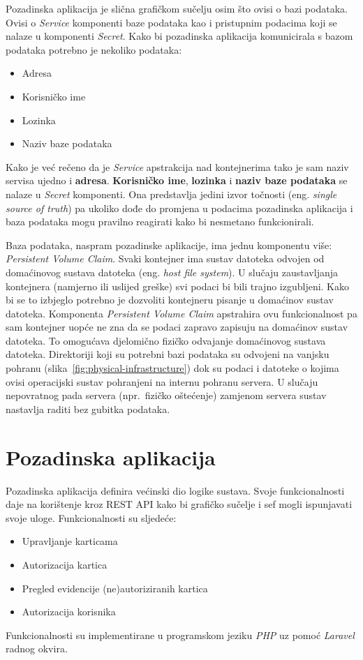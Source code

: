 Pozadinska aplikacija je slična grafičkom sučelju osim što ovisi o bazi podataka.
Ovisi o \textit{Service} komponenti baze podataka kao i pristupnim podacima koji se nalaze u komponenti \textit{Secret}.
Kako bi pozadinska aplikacija komunicirala s bazom podataka potrebno je nekoliko podataka:
\begin{itemize}
    \item Adresa
    \item Korisničko ime
    \item Lozinka
    \item Naziv baze podataka
\end{itemize}

Kako je već rečeno da je \textit{Service} apstrakcija nad kontejnerima tako je sam naziv servisa ujedno i \textbf{adresa}.
\textbf{Korisničko ime}, \textbf{lozinka} i \textbf{naziv baze podataka} se nalaze u \textit{Secret} komponenti.
Ona predstavlja jedini izvor točnosti (eng. \textit{single source of truth}) pa ukoliko dođe do promjena
u podacima pozadinska aplikacija i baza podataka mogu pravilno reagirati kako bi nesmetano funkcionirali.

Baza podataka, naspram pozadinske aplikacije, ima jednu komponentu više: \textit{Persistent Volume Claim}.
Svaki kontejner ima sustav datoteka odvojen od domaćinovog sustava datoteka (eng. \textit{host file system}).
U slučaju zaustavljanja kontejnera (namjerno ili uslijed greške) svi podaci bi bili trajno izgubljeni.
Kako bi se to izbjeglo potrebno je dozvoliti kontejneru pisanje u domaćinov sustav datoteka.
Komponenta \textit{Persistent Volume Claim} apstrahira ovu funkcionalnost pa sam kontejner uopće ne zna da se podaci zapravo
zapisuju na domaćinov sustav datoteka.
To omogućava djelomično fizičko odvajanje domaćinovog sustava datoteka.
Direktoriji koji su potrebni bazi podataka su odvojeni na vanjsku pohranu (slika~\ref{fig:physical-infrastructure}) dok su
podaci i datoteke o kojima ovisi operacijski sustav pohranjeni na internu pohranu servera.
U slučaju nepovratnog pada servera (npr.~fizičko oštećenje) zamjenom servera sustav nastavlja raditi bez gubitka podataka.

\section{Pozadinska aplikacija}

Pozadinska aplikacija definira većinski dio logike sustava.
Svoje funkcionalnosti daje na korištenje kroz REST API kako bi grafičko sučelje i sef mogli ispunjavati svoje uloge.
Funkcionalnosti su sljedeće:

\begin{itemize}
    \item Upravljanje karticama
    \item Autorizacija kartica
    \item Pregled evidencije (ne)autoriziranih kartica
    \item Autorizacija korisnika
\end{itemize}

Funkcionalnosti su implementirane u programskom jeziku \textit{PHP} uz pomoć \textit{Laravel} radnog okvira.
